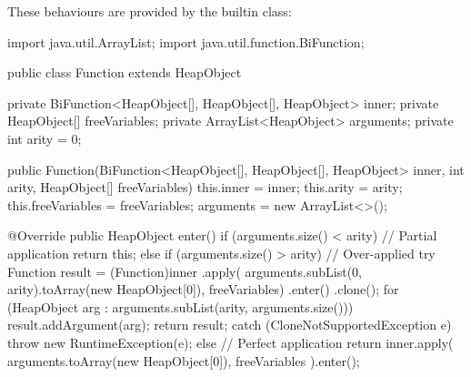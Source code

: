 \documentclass[dissertation.tex]{subfiles}
\begin{document}
{{{{                These behaviours are provided by the  builtin class:

                \begin{javafigure}
                import java.util.ArrayList;
                import java.util.function.BiFunction;
                                
                public class Function extends HeapObject {
                    private BiFunction<HeapObject[], HeapObject[], HeapObject> inner;
                    private HeapObject[] freeVariables;
                    private ArrayList<HeapObject> arguments;
                    private int arity = 0;
                                
                    public Function(BiFunction<HeapObject[], HeapObject[], HeapObject> inner,
                                    int arity, HeapObject[] freeVariables) {
                        this.inner = inner;
                        this.arity = arity;
                        this.freeVariables = freeVariables;
                        arguments = new ArrayList<>();
                    }
                                
                    @Override
                    public HeapObject enter() {
                        if (arguments.size() < arity) { // Partial application
                            return this;
                        }
                        else if (arguments.size() > arity) { // Over-applied
                            try {
                                Function result = (Function)inner
                                    .apply(
                                        arguments.subList(0, arity).toArray(new HeapObject[0]),
                                        freeVariables)
                                    .enter()
                                    .clone();
                                for (HeapObject arg : arguments.subList(arity, arguments.size()))
                                    result.addArgument(arg);
                                return result;
                            }
                            catch (CloneNotSupportedException e) {
                                throw new RuntimeException(e);
                            }
                        }
                        else { // Perfect application
                            return inner.apply(
                                arguments.toArray(new HeapObject[0]), freeVariables
                            ).enter();
                        }
                    }
                                
}
\end{javafigure}}}}}
\end{document}
